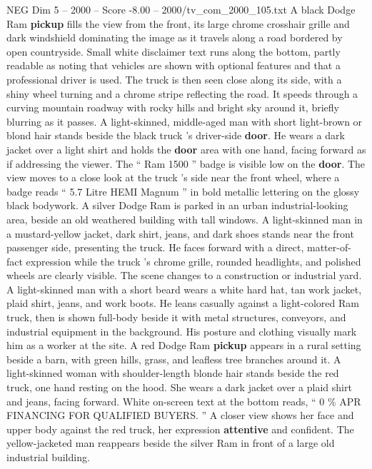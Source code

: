 \begin{textsample}{NEG Dim 5 – 2000 – Score -8.00 – 2000/tv\_com\_2000\_105.txt}  \label{ex:f5_neg_071}
A black Dodge Ram \textbf{pickup} fills the view from the front, its large chrome crosshair grille and dark windshield dominating the image as it travels along a road bordered by open countryside.
Small white disclaimer text runs along the bottom, partly readable as noting that vehicles are shown with optional features and that a professional driver is used.
The truck is then seen close along its side, with a shiny wheel turning and a chrome stripe reflecting the road.
It speeds through a curving mountain roadway with rocky hills and bright sky around it, briefly blurring as it passes.
A light-skinned, middle-aged man with short light-brown or blond hair stands beside the black truck ’s driver-side \textbf{door}.
He wears a dark jacket over a light shirt and holds the \textbf{door} area with one hand, facing forward as if addressing the viewer.
The “ Ram 1500 ” badge is visible low on the \textbf{door}.
The view moves to a close look at the truck ’s side near the front wheel, where a badge reads “ 5.7 Litre HEMI Magnum ” in bold metallic lettering on the glossy black bodywork.
A silver Dodge Ram is parked in an urban industrial-looking area, beside an old weathered building with tall windows.
A light-skinned man in a mustard-yellow jacket, dark shirt, jeans, and dark shoes stands near the front passenger side, presenting the truck.
He faces forward with a direct, matter-of-fact expression while the truck ’s chrome grille, rounded headlights, and polished wheels are clearly visible.
The scene changes to a construction or industrial yard.
A light-skinned man with a short beard wears a white hard hat, tan work jacket, plaid shirt, jeans, and work boots.
He leans casually against a light-colored Ram truck, then is shown full-body beside it with metal structures, conveyors, and industrial equipment in the background.
His posture and clothing visually mark him as a worker at the site.
A red Dodge Ram \textbf{pickup} appears in a rural setting beside a barn, with green hills, grass, and leafless tree branches around it.
A light-skinned woman with shoulder-length blonde hair stands beside the red truck, one hand resting on the hood.
She wears a dark jacket over a plaid shirt and jeans, facing forward.
White on-screen text at the bottom reads, “ 0 \% APR FINANCING FOR QUALIFIED BUYERS. ” A closer view shows her face and upper body against the red truck, her expression \textbf{attentive} and confident.
The yellow-jacketed man reappears beside the silver Ram in front of a large old industrial building.

\end{textsample}
